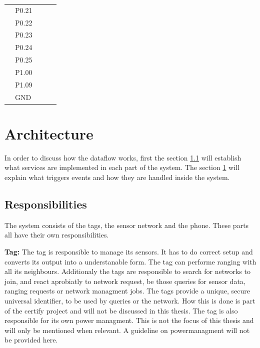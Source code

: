 \begin{table}[]
\begin{tabular}{l|l|l|l|l|}
\multicolumn{1}{|l|}{} & P0.21  &               &             &             \\
\multicolumn{1}{|l|}{} & P0.22  &               &             &             \\
\multicolumn{1}{|l|}{} & P0.23  &               &             &             \\
\multicolumn{1}{|l|}{} & P0.24  &               &             &             \\
\multicolumn{1}{|l|}{} & P0.25  &               &             &             \\
\multicolumn{1}{|l|}{} & P1.00  &               &             &             \\
\multicolumn{1}{|l|}{} & P1.09  &               &             &             \\
\multicolumn{1}{|l|}{} & GND    &               &             &             \\
\hline
\end{tabular}
\end{table}


\section{Architecture}
\label{ss:dataflow}

In order to discuss how the dataflow works, first the section \ref{ss:responsibility} will establish what services are implemented in each part of the system.
The section \ref{ss:dataflow} will explain what triggers events and how they are handled inside the system.

\subsection{Responsibilities}
\label{ss:responsibility}
The system consists of the tags, the sensor network and the phone.
These parts all have their own responsibilities.

\textbf{Tag:} 
The tag is responsible to manage its sensors. 
It has to do correct setup and converts its output into a understanable form.
The tag can performe ranging with all its neighbours.
Additionaly the tags are responsible to search for networks to join, and react aprobiatly to network request, be those queries for sensor data, ranging requests or network managment jobs. 
The tags provide a unique, secure universal identifier, to be used by queries or the network.
How this is done is part of the certify project and will not be discussed in this thesis.
The tag is also responsible for its own power managment.
This is not the focus of this thesis and will only be mentioned when relevant.
A guideline on powermanagment will not be provided here.


